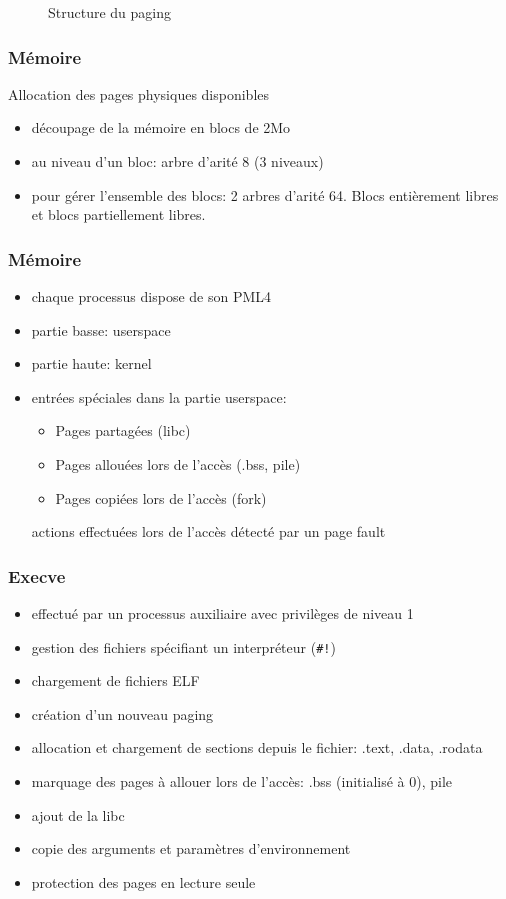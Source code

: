 \documentclass[10pt,a4paper]{beamer}
\begin{document}
\begin{frame}
\begin{figure}
\begin{tikzpicture}
  \end{tikzpicture}
    \caption{Structure du paging}
  \end{figure}

\end{frame}

\begin{frame}
  \frametitle{Mémoire}
  Allocation des pages physiques disponibles

  \begin{itemize}
  \item découpage de la mémoire en blocs de 2Mo
  \item au niveau d'un bloc: arbre d'arité 8 (3 niveaux)
  \item pour gérer l'ensemble des blocs:
    2 arbres d'arité 64. Blocs entièrement libres et blocs partiellement libres.
  \end{itemize}
\end{frame}

\begin{frame}
  \frametitle{Mémoire}

  \begin{itemize}
  \item chaque processus dispose de son PML4
  \item partie basse: userspace
  \item partie haute: kernel
  \item entrées spéciales dans la partie userspace:
    \begin{itemize}
    \item Pages partagées (libc)
    \item Pages allouées lors de l'accès (.bss, pile)
    \item Pages copiées lors de l'accès (fork)
    \end{itemize}
    actions effectuées lors de l'accès détecté par un page fault
  \end{itemize}
\end{frame}

\begin{frame}
  \frametitle{Execve}
  \begin{itemize}
  \item effectué par un processus auxiliaire avec privilèges de niveau 1
  \item gestion des fichiers spécifiant un interpréteur (\texttt{\#!})
  \item chargement de fichiers ELF
  \item création d'un nouveau paging
  \item allocation et chargement de sections depuis le fichier: .text, .data, .rodata
  \item marquage des pages à allouer lors de l'accès: .bss (initialisé à 0), pile
  \item ajout de la libc
  \item copie des arguments et paramètres d'environnement
  \item protection des pages en lecture seule
  \end{itemize}
\end{frame}
\end{document}
